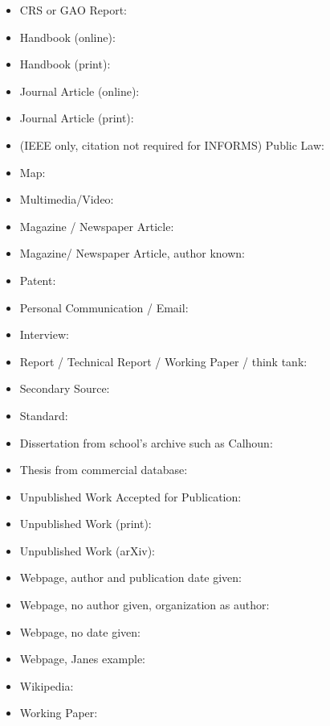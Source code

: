 \begin{itemize}
    \item CRS or GAO Report:  \citep{erwin_2011}
    \item Handbook (online):  \citep{TSP-168:1972}
    \item Handbook (print):  \citep{transmission_comm_85}
    \item Journal Article (online):  \citep{sanico_2018}
    \item Journal Article (print):  \citep{Griffin:2009}
    \item (IEEE only, citation not required for INFORMS) Public Law:  \citep{americans_1991}
    \item Map:  \citep{Google_2017}
    \item Multimedia/Video:  \citep{youtube_2014}
    \item Magazine / Newspaper Article:  \citep{linguine_2016}
    \item Magazine/ Newspaper Article, author known:  \citep{Beforebad:2014}
    \item Patent:  \citep{bell_1876}
    \item Personal Communication / Email:  \citep{Wunkerbunk:2002}
    \item Interview:  \citep{Monster:1985}
    \item Report / Technical Report / Working Paper / think tank:  \citep{dixon_2017,Wonka:1972}
    \item Secondary Source:  \citep{Nicholson:2003}
    \item Standard:  \citep{standard_1968}
    \item Dissertation from school's archive such as Calhoun:  \citep{Yoshi:1988}
    \item Thesis from commercial database:  \citep{Nekeip:2008}
    \item Unpublished Work Accepted for Publication:  \citep{Horse:1996} 
    \item Unpublished Work (print):  \citep{Horse:1995} 
    \item Unpublished Work (arXiv):  \citep{simonyan-vgg16-2015}
    \item Webpage, author and publication date given:  \citep{Sushi:1995}
    \item Webpage, no author given, organization as author:  \citep{FBI_2017}
    \item Webpage, no date given:  \citep{Python:2017}
    \item Webpage, Janes example:  \citep{Janes_2017}
    \item Wikipedia: \citep{wiki_2016}
    \item Working Paper:  \citep{sushi_2021}    
\end{itemize}

